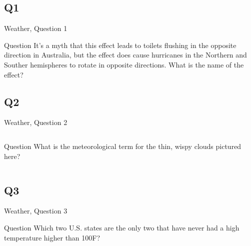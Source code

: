 \documentclass[11pt]{beamer}
\begin{document}
\subsection*{Q1}
\begin{frame}[t]{Weather, Question 1}
\begin{block}{Question}
It's a myth that this effect leads to toilets flushing in the opposite direction in Australia, but the effect does cause hurricanes in the Northern and Souther hemispheres to rotate in opposite directions. What is the name of the effect?
\end{block}
\end{frame}
\subsection*{Q2}
\begin{frame}[t]{Weather, Question 2}
\begin{columns}[T,totalwidth=\linewidth]
\begin{column}{0.32\linewidth}
\begin{block}{Question}
What is the meteorological term for the thin, wispy clouds pictured here?
\end{block}
\end{column}
\begin{column}{0.65\linewidth}
\begin{center}
\texttt{[image: \{Images/cirrus]}.jpg}
\end{center}
\end{column}
\end{columns}
\end{frame}
\subsection*{Q3}
\begin{frame}[t]{Weather, Question 3}
\begin{block}{Question}
Which two U.S. states are the only two that have never had a high temperature higher than 100\textdegree{}F\@?
\end{block}
\end{frame}
\end{document}

